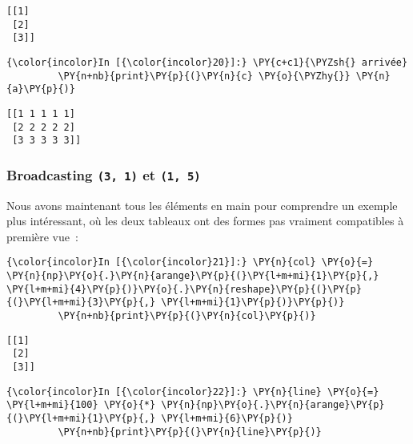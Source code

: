     \begin{Verbatim}[commandchars=\\\{\}]
[[1]
 [2]
 [3]]

    \end{Verbatim}

    \begin{Verbatim}[commandchars=\\\{\}]
{\color{incolor}In [{\color{incolor}20}]:} \PY{c+c1}{\PYZsh{} arrivée}
         \PY{n+nb}{print}\PY{p}{(}\PY{n}{c} \PY{o}{\PYZhy{}} \PY{n}{a}\PY{p}{)}
\end{Verbatim}


    \begin{Verbatim}[commandchars=\\\{\}]
[[1 1 1 1 1]
 [2 2 2 2 2]
 [3 3 3 3 3]]

    \end{Verbatim}

    \hypertarget{broadcasting-3-1-et-1-5}{%
\subsubsection{\texorpdfstring{Broadcasting \texttt{(3,\ 1)} et
\texttt{(1,\ 5)}}{Broadcasting (3, 1) et (1, 5)}}\label{broadcasting-3-1-et-1-5}}

    Nous avons maintenant tous les éléments en main pour comprendre un
exemple plus intéressant, où les deux tableaux ont des formes pas
vraiment compatibles à première vue~:

    \begin{Verbatim}[commandchars=\\\{\}]
{\color{incolor}In [{\color{incolor}21}]:} \PY{n}{col} \PY{o}{=} \PY{n}{np}\PY{o}{.}\PY{n}{arange}\PY{p}{(}\PY{l+m+mi}{1}\PY{p}{,} \PY{l+m+mi}{4}\PY{p}{)}\PY{o}{.}\PY{n}{reshape}\PY{p}{(}\PY{p}{(}\PY{l+m+mi}{3}\PY{p}{,} \PY{l+m+mi}{1}\PY{p}{)}\PY{p}{)}
         \PY{n+nb}{print}\PY{p}{(}\PY{n}{col}\PY{p}{)}
\end{Verbatim}


    \begin{Verbatim}[commandchars=\\\{\}]
[[1]
 [2]
 [3]]

    \end{Verbatim}

    \begin{Verbatim}[commandchars=\\\{\}]
{\color{incolor}In [{\color{incolor}22}]:} \PY{n}{line} \PY{o}{=} \PY{l+m+mi}{100} \PY{o}{*} \PY{n}{np}\PY{o}{.}\PY{n}{arange}\PY{p}{(}\PY{l+m+mi}{1}\PY{p}{,} \PY{l+m+mi}{6}\PY{p}{)}
         \PY{n+nb}{print}\PY{p}{(}\PY{n}{line}\PY{p}{)}
\end{Verbatim}


